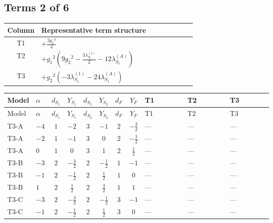 \documentclass[8pt]{article}
\begin{document}
\begin{landscape}
\subsection*{Terms 2 of 6}
\begin{center}
\begin{tabular}{@{}c >{\raggedright\arraybackslash}p{0.82\linewidth}@{}}
\toprule
Column & Representative term structure \\
\midrule
T1 & \(\displaystyle +\frac{3 {g_2}^4}{4}\) \\
\midrule
T2 & \(\displaystyle +{g_1}^2 \left(9 {g_2}^2-\frac{3 {\lambda_{S_1}^{(1)}}}{2}-12 {\lambda_{S_1}^{(A)}}\right)\) \\
\midrule
T3 & \(\displaystyle +{g_2}^2 (-3 {\lambda_{S_1}^{(1)}}-24 {\lambda_{S_1}^{(A)}})\) \\
\midrule
\bottomrule
\end{tabular}
\end{center}
\smallskip
\tiny
\begin{longtable}{@{}llcccccc >{\raggedright\arraybackslash}p{0.21\linewidth} >{\raggedright\arraybackslash}p{0.21\linewidth} >{\raggedright\arraybackslash}p{0.21\linewidth}@{}}
\toprule
Model & $\alpha$ & $d_{S_1}$ & $Y_{S_1}$ & $d_{S_2}$ & $Y_{S_2}$ & $d_F$ & $Y_F$ & T1 & T2 & T3 \\
\midrule
\endfirsthead
\toprule
Model & $\alpha$ & $d_{S_1}$ & $Y_{S_1}$ & $d_{S_2}$ & $Y_{S_2}$ & $d_F$ & $Y_F$ & T1 & T2 & T3 \\
\midrule
\endhead
T3-A & $-4$ & $1$ & $-2$ & $3$ & $-1$ & $2$ & $-\frac{3}{2}$ & --- & --- & --- \\
\midrule
T3-A & $-2$ & $1$ & $-1$ & $3$ & $0$ & $2$ & $-\frac{1}{2}$ & --- & --- & --- \\
\midrule
T3-A & $0$ & $1$ & $0$ & $3$ & $1$ & $2$ & $\frac{1}{2}$ & --- & --- & --- \\
\midrule
T3-B & $-3$ & $2$ & $-\frac{3}{2}$ & $2$ & $-\frac{1}{2}$ & $1$ & $-1$ & --- & --- & --- \\
\midrule
T3-B & $-1$ & $2$ & $-\frac{1}{2}$ & $2$ & $\frac{1}{2}$ & $1$ & $0$ & --- & --- & --- \\
\midrule
T3-B & $1$ & $2$ & $\frac{1}{2}$ & $2$ & $\frac{3}{2}$ & $1$ & $1$ & --- & --- & --- \\
\midrule
T3-C & $-3$ & $2$ & $-\frac{3}{2}$ & $2$ & $-\frac{1}{2}$ & $3$ & $-1$ & --- & --- & --- \\
\midrule
T3-C & $-1$ & $2$ & $-\frac{1}{2}$ & $2$ & $\frac{1}{2}$ & $3$ & $0$ & --- & --- & --- \\

\end{longtable}
\end{landscape}
\end{document}
